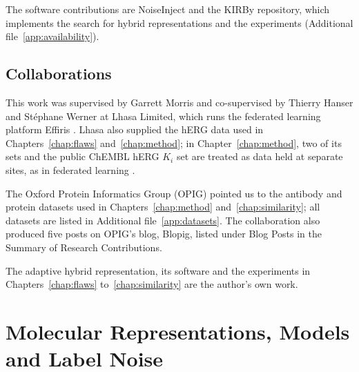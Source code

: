 The software contributions are NoiseInject and the KIRBy repository, which implements the search for hybrid representations and the experiments (Additional file~\ref{app:availability}).


\section{Collaborations}

This work was supervised by Garrett Morris and co-supervised by Thierry Hanser and St\'ephane Werner at Lhasa Limited, which runs the federated learning platform Effiris \citep{Bassani2023}. Lhasa also supplied the hERG data used in Chapters~\ref{chap:flaws} and~\ref{chap:method}; in Chapter~\ref{chap:method}, two of its sets and the public ChEMBL hERG $K_i$ set are treated as data held at separate sites, as in federated learning \citep{Bassani2023, Hanser2023}.

The Oxford Protein Informatics Group (OPIG) pointed us to the antibody and protein datasets used in Chapters~\ref{chap:method} and~\ref{chap:similarity}; all datasets are listed in Additional file~\ref{app:datasets}. The collaboration also produced five posts on OPIG's blog, Blopig, listed under Blog Posts in the Summary of Research Contributions.

The adaptive hybrid representation, its software and the experiments in Chapters~\ref{chap:flaws} to~\ref{chap:similarity} are the author's own work.



\pagebreak
\chapter{Molecular Representations, Models and Label Noise}\label{chap:background}\label{sec2}

